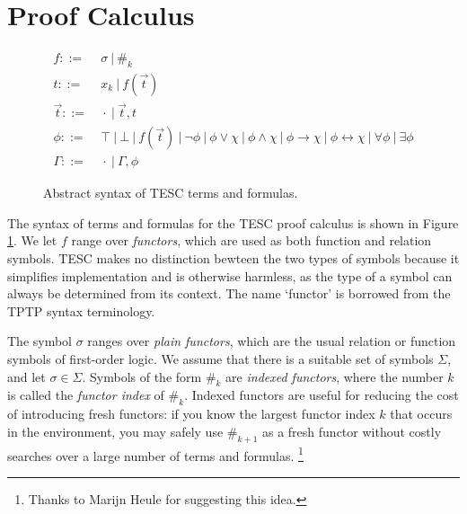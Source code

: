 \documentclass[12pt]{article}
\newcommand{\idf}[1]{\#_{#1}}
\begin{document}
% 
% 
\section{Proof Calculus} \label{sec:proof-calc}

\begin{figure}
  \centering
  \begin{align*}
  f ::= &\ \sigma\ |\ \idf{k}\\
  t ::= &\ x_k\ |\ f(\vec{t})\\
  \vec{t} ::= &\ \cdot\ |\ \vec{t}, t\\
  \phi ::= &\ \top\ |\ \bot\ |\ f(\vec{t})\ |\ \lnot \phi\ |\ \phi \lor \chi\ |\ \phi \land \chi\ |\ \phi \to \chi\ |\ \phi \leftrightarrow \chi\ |\ \forall \phi\ |\ \exists \phi\\
  \Gamma ::= &\ \cdot\ |\ \Gamma, \phi
  \end{align*}
  \caption{Abstract syntax of TESC terms and formulas.}
  \label{fig:abst-syn}
\end{figure}
The syntax of terms and formulas for the TESC proof calculus is shown in Figure \ref{fig:abst-syn}. 
We let $f$ range over \textit{functors}, which are used as both function and relation symbols.
TESC makes no distinction bewteen the two types of symbols because it simplifies implementation 
and is otherwise harmless, as the type of a symbol can always be determined from its context.
The name `functor' is borrowed from the TPTP syntax terminology.

The symbol $\sigma$ ranges over \textit{plain functors}, which are the usual relation or function 
symbols of first-order logic. We assume that there is a suitable set of symbols $\Sigma$, and let 
$\sigma \in \Sigma$. Symbols of the form $\idf{k}$ are \textit{indexed functors}, where the number 
$k$ is called the \textit{functor index} of $\idf{k}$. Indexed functors are useful for reducing
the cost of introducing fresh functors: if you know the largest functor index $k$ that occurs in the 
environment, you may safely use $\idf{k+1}$ as a fresh functor without costly searches over a large 
number of terms and formulas. \footnote{Thanks to Marijn Heule for suggesting this idea.}
\end{document}
